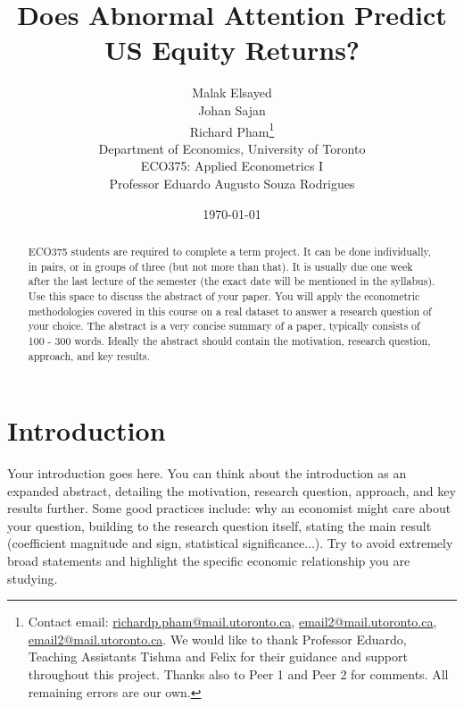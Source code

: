 \documentclass[11pt]{article}
\title{\bf{Does Abnormal Attention Predict US Equity Returns?}}
\begin{document}
\begin{titlepage}

\author{Malak Elsayed \\ Johan Sajan \\ Richard Pham\thanks{Contact email: \href{mailto:email@mail.utoronto.ca}{richardp.pham@mail.utoronto.ca}, \href{mailto:email@mail.utoronto.ca}{email2@mail.utoronto.ca}, \href{mailto:email@mail.utoronto.ca}{email2@mail.utoronto.ca}. We would like to thank Professor Eduardo, Teaching Assistants Tishma and Felix  for their guidance and support throughout this project. Thanks also to Peer 1 and Peer 2 for comments. All remaining errors are our own.}  \\ Department of Economics, University of Toronto \\ ECO375: Applied Econometrics I \\ Professor Eduardo Augusto Souza Rodrigues}
\date{\today}
\maketitle


\thispagestyle{empty} %
\setcounter{page}{0}
\begin{abstract}
\linespread{1.25} %
\selectfont
\noindent 
ECO375 students are required to complete a term project. It can be done individually, in pairs, or in groups of three (but not more than that). It is usually due one week after the last lecture of the semester (the exact date will be mentioned in the syllabus). Use this space to discuss the abstract of your paper. You will apply the econometric methodologies covered in this course on a real dataset to answer a research question of your choice. The abstract is a very concise summary of a paper, typically consists of 100 - 300 words. Ideally the abstract should contain the motivation, research question, approach, and key results. 
\end{abstract}
\end{titlepage}

\pagebreak %

\doublespacing %


\section{Introduction}
Your introduction goes here. You can think about the introduction as an expanded abstract, detailing the motivation, research question, approach, and key results further. Some good practices include: why an economist might care about your question, building to the research question itself, stating the main result (coefficient magnitude and sign, statistical significance...). Try to avoid extremely broad statements and highlight the specific economic relationship you are studying. 
\end{document}
